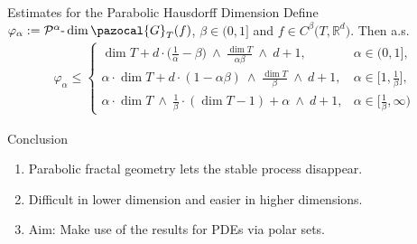 \documentclass{beamer}
\theoremstyle{plain}
\theoremstyle{definition}
\theoremstyle{remark}
\newcommand{\Rd}{{\mathbb R^d}}
\newcommand{\1}{\mathbbm{1}}
\newcommand{\m}{\text{-}}
\newcommand{\ph}{\varphi}
\begin{document}
\begin{frame}{Estimates for the Parabolic Hausdorff Dimension}
Define $\ph_\alpha := \mathcal{P}^\alpha\m\dim \pazocal{G}_T(f)$, $\beta \in (0,1]$ and $f\in C^\beta\big(T,\Rd\big)$. Then a.s.
\begin{align*}
\ph_\alpha \leq
\begin{cases}
\dim T + d \cdot \big(\frac{1}{\alpha} - \beta \big) \ \wedge \ \frac{\dim T}{\alpha \beta} \ \wedge \ d+1, & \alpha \in (0,1],\\
\alpha \cdot \dim T + d \cdot (1 - \alpha\beta) \ \wedge \ \frac{\dim T}{\beta} \ \wedge \ d+1, & \alpha \in \big[1,\frac{1}{\beta}\big],\\
\alpha \cdot \dim T \ \wedge \ \frac{1}{\beta} \cdot (\dim T - 1) + \alpha \ \wedge \ d+1, & \alpha \in \big[\frac{1}{\beta},\infty\big)
\end{cases}
\end{align*}
\end{frame}

\begin{frame}{Conclusion}
\begin{enumerate}
\item Parabolic fractal geometry lets the stable process disappear.\\[20pt]
\item Difficult in lower dimension and easier in higher dimensions.\\[20pt]
\item Aim: Make use of the results for PDEs via polar sets.
\end{enumerate}
\end{frame}
\end{document}
